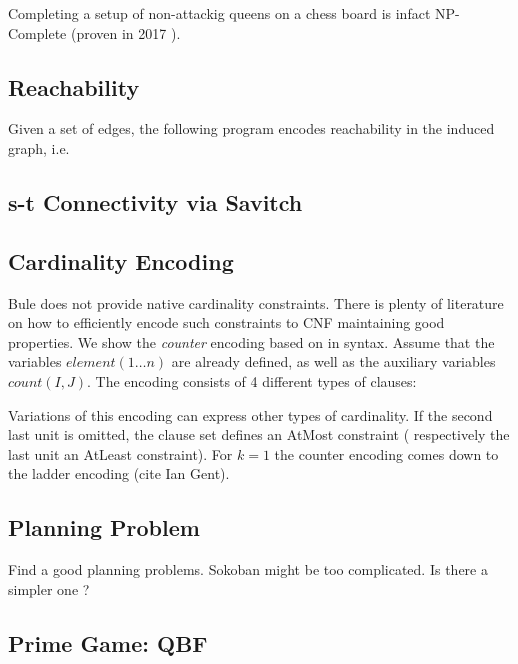 \documentclass[runningheads]{llncs}
\begin{document}


Completing a setup of non-attackig queens on a chess board is infact NP-Complete (proven in 2017 \cite{Gent17}).

\subsection{Reachability}

Given a set of edges, the following program encodes reachability in the induced graph, i.e. 



\subsection{s-t Connectivity via Savitch}

\subsection{Cardinality Encoding}

Bule does not provide native cardinality constraints. 
There is plenty of literature on how to efficiently encode such constraints to CNF maintaining good properties. 
We show the \emph{counter} encoding based on \cite{Sinz05} in \bnice syntax.
Assume that the variables $element(1\ldots n)$ are already defined, as well as 
the auxiliary variables $count(I,J)$. 
The encoding consists of 4 different types of clauses: 



Variations of this encoding can express other types of cardinality.
If the second last unit is omitted, the clause set defines an AtMost constraint ( respectively the last unit an AtLeast constraint). 
For $k=1$ the counter encoding comes down to the ladder encoding (cite Ian Gent). 

\subsection{Planning Problem}

Find a good planning problems. 
Sokoban might be too complicated. 
Is there a simpler one ? 

\subsection{Prime Game: QBF}
\end{document}
